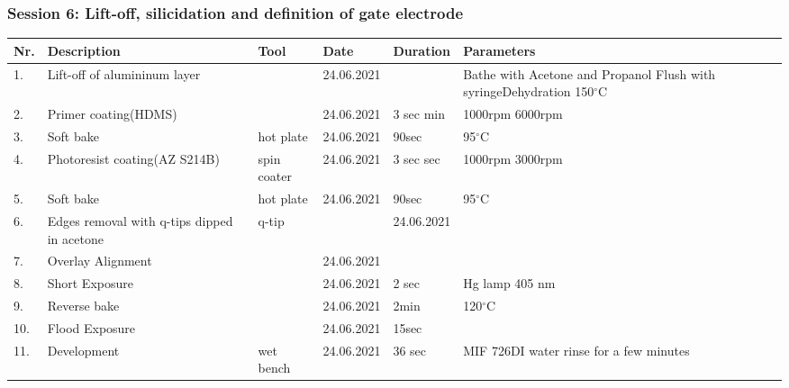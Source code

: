 \vspace{-0.1cm}
\subsubsection*{Session 6: Lift-off, silicidation and definition of gate electrode}     
\vspace{-0.5cm}   
\begin{table}[H]
\footnotesize
\begin{tabular}{| p{0.4cm}| p{4.0cm}| p{3.0cm}|p{2.0cm}| p{2.0cm}|p{13.5cm}|}
\hline
\textbf{Nr.}&\textbf{Description} &\textbf{Tool}& \textbf{Date}  &\textbf{Duration} & \textbf{Parameters}\\ \hline\hline
1. & Lift-off of alumininum layer &  & 24.06.2021 &  & Bathe with Acetone and Propanol\newline 
Flush with syringe\newline  Dehydration 150$^{\circ}$C\\\hline

2. &Primer coating\newline (HDMS) & & 24.06.2021&  3 sec \newline 1 min&   1000rpm \newline  6000rpm \\\hline
3. &Soft bake & hot plate & 24.06.2021 & 90sec& 95$^{\circ}$C\\\hline
4. & Photoresist coating\newline (AZ S214B)& spin coater & 24.06.2021 & 3 sec\newline 60 sec & 1000rpm \newline3000rpm \\\hline
5. &Soft bake & hot plate & 24.06.2021 & 90sec& 95$^{\circ}$C\\\hline
6. & Edges removal with q-tips dipped  in acetone& q-tip & & 24.06.2021 &  \\\hline
7. & Overlay Alignment &  &   24.06.2021 & &\\\hline
8. & Short Exposure&  &    24.06.2021&2 sec & Hg lamp 405 nm \\\hline
9. & Reverse bake & & 24.06.2021&2min & 120$^{\circ}$C\\\hline
10. & Flood Exposure&  &    24.06.2021& 15sec &\\\hline
11. & Development& wet bench &   24.06.2021&  36 sec & MIF 726\newline DI water rinse for a few minutes \\\hline
\end{tabular}
\end{table} 